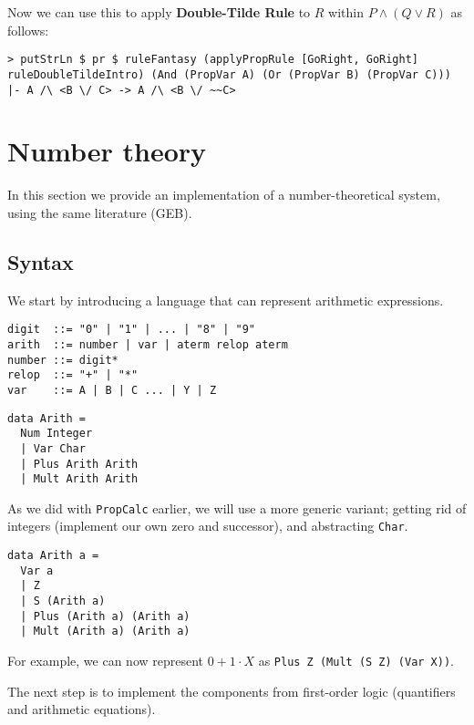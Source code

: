 \documentclass{article}
\begin{document}
Now we can use this to apply \textbf{Double-Tilde Rule} to $R$ within $P \land (Q \lor R)$ as follows:

\begin{lstlisting}
> putStrLn $ pr $ ruleFantasy (applyPropRule [GoRight, GoRight] ruleDoubleTildeIntro) (And (PropVar A) (Or (PropVar B) (PropVar C)))
|- A /\ <B \/ C> -> A /\ <B \/ ~~C>
\end{lstlisting}

\section{Number theory}

In this section we provide an implementation of a number-theoretical system, using the same literature (GEB).

\subsection{Syntax}

We start by introducing a language that can represent arithmetic expressions.

\begin{minipage}{0.49\textwidth}
\begin{lstlisting}
digit  ::= "0" | "1" | ... | "8" | "9"
arith  ::= number | var | aterm relop aterm
number ::= digit*
relop  ::= "+" | "*"
var    ::= A | B | C ... | Y | Z
\end{lstlisting}
\end{minipage}
\begin{minipage}{0.49\textwidth}
\begin{lstlisting}
data Arith =
  Num Integer
  | Var Char
  | Plus Arith Arith
  | Mult Arith Arith
\end{lstlisting}
\end{minipage}

As we did with \texttt{PropCalc} earlier, we will use a more generic variant; getting rid of integers (implement our own zero and successor), and abstracting \texttt{Char}.

\begin{lstlisting}
data Arith a =
  Var a
  | Z
  | S (Arith a)
  | Plus (Arith a) (Arith a)
  | Mult (Arith a) (Arith a)
\end{lstlisting}

For example, we can now represent $0 + 1 \cdot X$ as \texttt{Plus Z (Mult (S Z) (Var X))}.

The next step is to implement the components from first-order logic (quantifiers and arithmetic equations).
\end{document}
